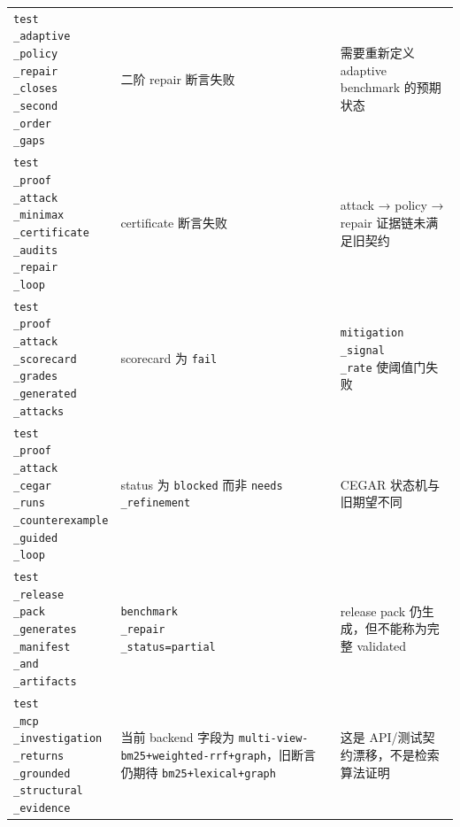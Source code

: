 \documentclass[UTF8,12pt,openany]{ctexbook}
\begin{document}
\begin{center}
\begin{longtable}{|p{}|p{}|p{}|}
\texttt{test\\_adaptive\\_policy\\_repair\\_closes\\_second\\_order\\_gaps} & 二阶 repair 断言失败 & 需要重新定义 adaptive benchmark 的预期状态 \\
\texttt{test\\_proof\\_attack\\_minimax\\_certificate\\_audits\\_repair\\_loop} & certificate 断言失败 & attack → policy → repair 证据链未满足旧契约 \\
\texttt{test\\_proof\\_attack\\_scorecard\\_grades\\_generated\\_attacks} & scorecard 为 \texttt{fail} & \texttt{mitigation\\_signal\\_rate} 使阈值门失败 \\
\texttt{test\\_proof\\_attack\\_cegar\\_runs\\_counterexample\\_guided\\_loop} & status 为 \texttt{blocked} 而非 \texttt{needs\\_refinement} & CEGAR 状态机与旧期望不同 \\
\texttt{test\\_release\\_pack\\_generates\\_manifest\\_and\\_artifacts} & \texttt{benchmark\\_repair\\_status=partial} & release pack 仍生成，但不能称为完整 validated \\
\texttt{test\\_mcp\\_investigation\\_returns\\_grounded\\_structural\\_evidence} & 当前 backend 字段为 \texttt{multi-view-bm25+weighted-rrf+graph}，旧断言仍期待 \texttt{bm25+lexical+graph} & 这是 API/测试契约漂移，不是检索算法证明 \\
\bottomrule
\end{longtable}
\end{center}
\end{document}
